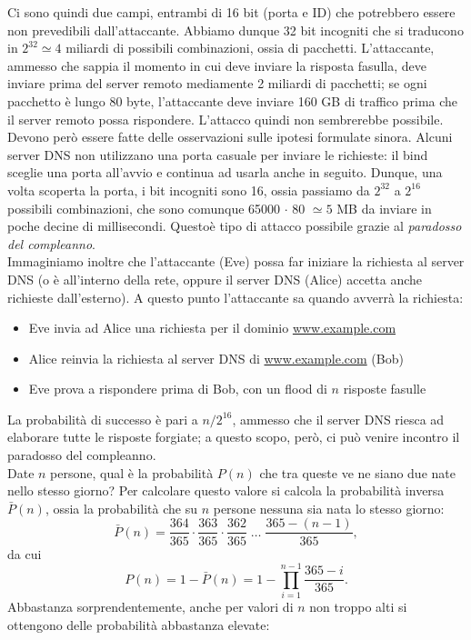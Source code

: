 Ci sono quindi due campi, entrambi di 16 bit (porta e ID) che potrebbero essere non prevedibili dall'attaccante. Abbiamo dunque 32 bit incogniti che si traducono in $2^{32} \simeq 4$ miliardi di possibili combinazioni, ossia di pacchetti. L'attaccante, ammesso che sappia il momento in cui deve inviare la risposta fasulla, deve inviare prima del server remoto mediamente 2 miliardi di pacchetti; se ogni pacchetto è lungo 80 byte, l'attaccante deve inviare 160 GB di traffico prima che il server remoto possa rispondere. L'attacco quindi non sembrerebbe possibile.\\
Devono però essere fatte delle osservazioni sulle ipotesi formulate sinora. Alcuni server DNS non utilizzano una porta casuale per inviare le richieste: il bind sceglie una porta all'avvio e continua ad usarla anche in seguito. Dunque, una volta scoperta la porta, i bit incogniti sono 16, ossia passiamo da $2^{32}$ a $2^{16}$ possibili combinazioni, che sono comunque 65000 $\cdot$ 80 $\simeq 5$ MB da inviare in poche decine di millisecondi. Questoè  tipo di attacco possibile grazie al \textit{paradosso del compleanno}.\\
Immaginiamo inoltre che l'attaccante (Eve) possa far iniziare la richiesta al server DNS (o è all'interno della rete, oppure il server DNS (Alice) accetta anche richieste dall'esterno). A questo punto l'attaccante sa quando avverrà la richiesta:
\begin{itemize}
	\item Eve invia ad Alice una richiesta per il dominio \url{www.example.com}
	\item Alice reinvia la richiesta al server DNS di \url{www.example.com} (Bob)
	\item Eve prova a rispondere prima di Bob, con un flood di $n$ risposte fasulle
\end{itemize}
La probabilità di successo è pari a $n/2^{16}$, ammesso che il server DNS riesca ad elaborare tutte le risposte forgiate; a questo scopo, però, ci può venire incontro il paradosso del compleanno.\\
Date $n$ persone, qual è la probabilità $P(n)$ che tra queste ve ne siano due nate nello stesso giorno? Per calcolare questo valore si calcola la probabilità inversa $\bar{P}(n)$, ossia la probabilità che su $n$ persone nessuna sia nata lo stesso giorno:
$$\bar{P}(n) = \frac{364}{365}\cdot\frac{363}{365}\cdot\frac{362}{365}\;\ldots\;\frac{365-(n-1)}{365},$$
da cui
$$P(n) = 1-\bar{P}(n) = 1-\prod_{i=1}^{n-1}\frac{365-i}{365}.$$
Abbastanza sorprendentemente, anche per valori di $n$ non troppo alti si ottengono delle probabilità abbastanza elevate:
